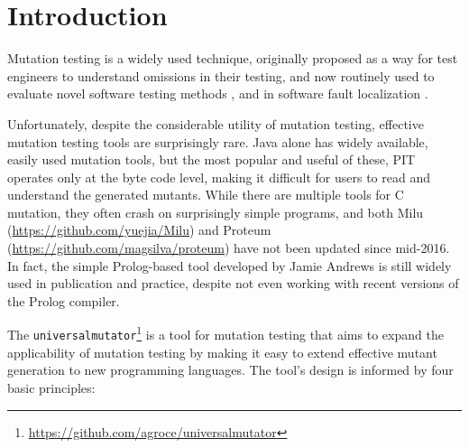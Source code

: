 \section{Introduction}

Mutation testing \cite{PracProg,Mut2000} is a widely used technique,
originally proposed as a way for test engineers to understand
omissions in their testing, and now routinely used to evaluate
novel software testing methods \cite{ISSTA13,ahmed_testedness}, and in software
fault localization \cite{Metallaxis,multilingual,TransProgTest}.

Unfortunately, despite the considerable utility of mutation testing,
effective mutation testing tools are surprisingly rare.  Java alone
has widely available, easily used mutation tools, but the most popular
and useful of these, PIT \cite{pittest} operates only at the byte code
level, making it difficult for users to read and understand the
generated mutants.  While there are multiple tools for C mutation,
they often crash on surprisingly simple programs, and both Milu
(\url{https://github.com/yuejia/Milu}) and Proteum
(\url{https://github.com/magsilva/proteum}) have not been updated
since mid-2016.  In fact, the simple Prolog-based tool developed by
Jamie Andrews \cite{mutant} is still widely used in publication and
practice, despite not even working with recent versions of the Prolog compiler.

The {\tt universalmutator}\footnote{\url{https://github.com/agroce/universalmutator}} is a tool for
mutation testing \cite{PracProg,Mut2000} that aims to expand the
applicability of mutation testing by making it easy to extend
effective mutant generation to new programming languages.
The tool's design is informed by four basic principles:

